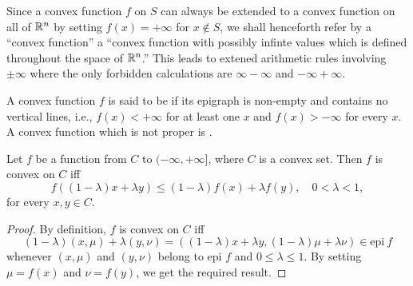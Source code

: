 \documentclass[11pt,a4paper]{article}
\begin{document}
\begin{remark}
% 
    Since a convex function $f$ on $S$ can always be extended to a convex function on all of $\mathbb{R}^n$ by setting $f(x) = +\infty$ for $x\notin S$, we shall henceforth refer by a ``convex function'' a  ``convex function with possibly infinte values which is defined throughout the space of $\mathbb{R}^n$.'' This leads to extened arithmetic rules involving $\pm \infty$ where the only forbidden calculations are $\infty -\infty$ and $-\infty + \infty$.
\end{remark}

\begin{definition}
    A convex function $f$ is said to be  if its epigraph is non-empty and contains no vertical lines, i.e., $f(x)<+\infty$ for at least one $x$ and $f(x)>-\infty$ for every $x$. A convex function which is not proper is .
\end{definition}


\begin{theorem}\label{thm:convex_function_def}
    Let $f$ be a function from $C$ to $(-\infty,+\infty]$, where $C$ is a convex set. Then $f$ is convex on $C$ iff 
    \begin{equation*}
        f((1-\lambda)x+\lambda y) \le (1-\lambda) f(x) + \lambda f(y), \quad 0<\lambda < 1,
    \end{equation*}
    for every $x,y\in C$.
\end{theorem}

\begin{proof}
    By definition, $f$ is convex on $C$ iff 
    \begin{equation*}
        (1-\lambda)(x,\mu) + \lambda (y,\nu) = ((1-\lambda)x+\lambda y,(1-\lambda)\mu+\lambda \nu) \in \mathrm{epi}\ f
    \end{equation*}
    whenever $(x,\mu)$ and $(y,\nu)$ belong to epi $f$ and $0\le\lambda\le 1$. By setting $\mu = f(x)$ and $\nu = f(y)$, we get the required result.
\end{proof}
\end{document}
